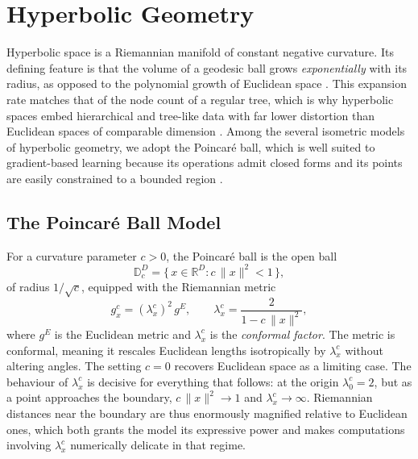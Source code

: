 \documentclass[12pt]{report}
\begin{document}
\section{Hyperbolic Geometry}
\label{sec:bg_hyperbolic}
Hyperbolic space is a Riemannian manifold of constant negative curvature. Its defining feature is that the volume of a geodesic ball grows \emph{exponentially} with its radius, as opposed to the polynomial growth of Euclidean space \cite{cannon1997hyperbolic}. This expansion rate matches that of the node count of a regular tree, which is why hyperbolic spaces embed hierarchical and tree-like data with far lower distortion than Euclidean spaces of comparable dimension \cite{sala2018representation, nickel2017poincare}. Among the several isometric models of hyperbolic geometry, we adopt the Poincar\'e ball, which is well suited to gradient-based learning because its operations admit closed forms and its points are easily constrained to a bounded region \cite{ganea2018hyperbolic}.

\subsection{The Poincar\'e Ball Model}
For a curvature parameter $c > 0$, the Poincar\'e ball is the open ball
\begin{equation}
    \mathbb{D}_c^D = \big\{\, x \in \mathbb{R}^D : c\,\|x\|^2 < 1 \,\big\},
\end{equation}
of radius $1/\sqrt{c}$, equipped with the Riemannian metric
\begin{equation}
    \label{eq:bg_metric}
    g_x^c = (\lambda_x^c)^2\, g^E,
    \qquad
    \lambda_x^c = \frac{2}{1 - c\,\|x\|^2},
\end{equation}
where $g^E$ is the Euclidean metric and $\lambda_x^c$ is the \emph{conformal factor}. The metric is conformal, meaning it rescales Euclidean lengths isotropically by $\lambda_x^c$ without altering angles. The setting $c=0$ recovers Euclidean space as a limiting case. The behaviour of $\lambda_x^c$ is decisive for everything that follows: at the origin $\lambda_0^c = 2$, but as a point approaches the boundary, $c\,\|x\|^2 \to 1$ and $\lambda_x^c \to \infty$. Riemannian distances near the boundary are thus enormously magnified relative to Euclidean ones, which both grants the model its expressive power and makes computations involving $\lambda_x^c$ numerically delicate in that regime.
\end{document}
